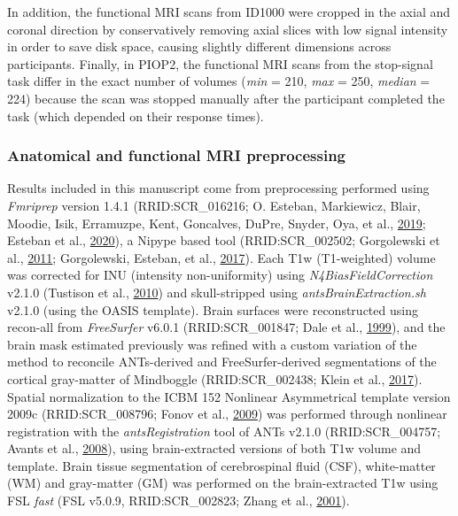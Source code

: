 \documentclass[11pt,american,a4paper,oneside,]{memoir} %
\begin{document}
In addition, the functional MRI scans from ID1000 were cropped in the axial and coronal direction by conservatively removing axial slices with low signal intensity in order to save disk space, causing slightly different dimensions across participants. Finally, in PIOP2, the functional MRI scans from the stop-signal task differ in the exact number of volumes (\emph{min} = 210, \emph{max} = 250, \emph{median} = 224) because the scan was stopped manually after the participant completed the task (which depended on their response times).

\hypertarget{anatomical-and-functional-mri-preprocessing}{%
\subsubsection{Anatomical and functional MRI preprocessing}\label{anatomical-and-functional-mri-preprocessing}}

Results included in this manuscript come from preprocessing performed using \emph{Fmriprep} version 1.4.1 (RRID:SCR\_016216; O. Esteban, Markiewicz, Blair, Moodie, Isik, Erramuzpe, Kent, Goncalves, DuPre, Snyder, Oya, et al., \protect\hyperlink{ref-Esteban2019-ri}{2019}; Esteban et al., \protect\hyperlink{ref-Esteban2020-qw}{2020}), a Nipype based tool (RRID:SCR\_002502; Gorgolewski et al., \protect\hyperlink{ref-Gorgolewski2011-aa}{2011}; Gorgolewski, Esteban, et al., \protect\hyperlink{ref-Gorgolewski2017-gb}{2017}). Each T1w (T1-weighted) volume was corrected for INU (intensity non-uniformity) using \emph{N4BiasFieldCorrection} v2.1.0 (Tustison et al., \protect\hyperlink{ref-Tustison2010-tk}{2010}) and skull-stripped using \emph{antsBrainExtraction.sh} v2.1.0 (using the OASIS template). Brain surfaces were reconstructed using recon-all from \emph{FreeSurfer} v6.0.1 (RRID:SCR\_001847; Dale et al., \protect\hyperlink{ref-Dale1999-rk}{1999}), and the brain mask estimated previously was refined with a custom variation of the method to reconcile ANTs-derived and FreeSurfer-derived segmentations of the cortical gray-matter of Mindboggle (RRID:SCR\_002438; Klein et al., \protect\hyperlink{ref-Klein2017-su}{2017}). Spatial normalization to the ICBM 152 Nonlinear Asymmetrical template version 2009c (RRID:SCR\_008796; Fonov et al., \protect\hyperlink{ref-Fonov2009-sr}{2009}) was performed through nonlinear registration with the \emph{antsRegistration} tool of ANTs v2.1.0 (RRID:SCR\_004757; Avants et al., \protect\hyperlink{ref-Avants2008-bv}{2008}), using brain-extracted versions of both T1w volume and template. Brain tissue segmentation of cerebrospinal fluid (CSF), white-matter (WM) and gray-matter (GM) was performed on the brain-extracted T1w using FSL \emph{fast} (FSL v5.0.9, RRID:SCR\_002823; Zhang et al., \protect\hyperlink{ref-Zhang2001-wa}{2001}).
\end{document}
